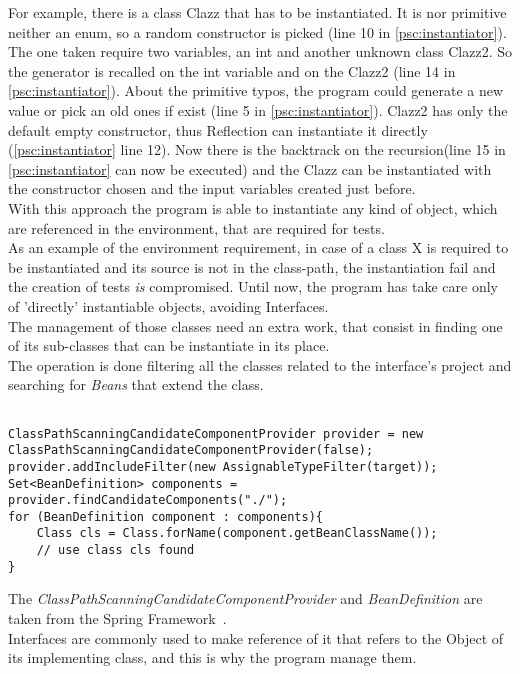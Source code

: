 For example, there is a class Clazz that has to be instantiated.
It is nor primitive neither an enum, so a random constructor is picked (line 10 in \ref{psc:instantiator}).
The one taken require two variables, an int and another unknown class Clazz2.
So the generator is recalled on the int variable and on the Clazz2 (line 14 in \ref{psc:instantiator}).
About the primitive typos, the program could generate a new value or pick an old ones if exist (line 5 in \ref{psc:instantiator}).
Clazz2 has only the default empty constructor, thus Reflection can instantiate it directly (\ref{psc:instantiator} line 12).
Now there is the backtrack on the recursion(line 15 in \ref{psc:instantiator} can now be executed) and the Clazz can be instantiated with the constructor chosen and the input variables created just before.\\
With this approach the program is able to instantiate any kind of object, which are referenced in the environment, that are required for tests.\\
As an example of the environment requirement, in case of a class X is required to be instantiated and its source is not in the class-path, the instantiation fail and the creation of tests \emph{is} compromised.
Until now, the program has take care only of 'directly' instantiable objects, avoiding Interfaces.\\
The management of those classes need an extra work, that consist in finding one of its sub-classes that can be instantiate in its place.\\
The operation is done filtering all the classes related to the interface's project and searching for \emph{Beans} that extend the class.\\
\begin{lstlisting}[caption={how to find a sub-class of an interface},label={lst:interfaceMngmnt}]% Start your code-block

ClassPathScanningCandidateComponentProvider provider = new ClassPathScanningCandidateComponentProvider(false);
provider.addIncludeFilter(new AssignableTypeFilter(target));
Set<BeanDefinition> components = provider.findCandidateComponents("./");
for (BeanDefinition component : components){
	Class cls = Class.forName(component.getBeanClassName());
	// use class cls found
}
\end{lstlisting}
The \emph{ClassPathScanningCandidateComponentProvider} and \emph{BeanDefinition} are taken from the Spring Framework~\cite{springFramework}.\\
Interfaces are commonly used to make reference of it that refers to the Object of its implementing class, and this is why the program manage them.